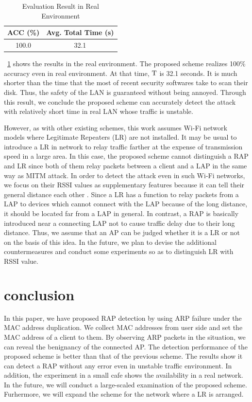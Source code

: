 \documentclass[conference]{IEEEtran}
\begin{document}
\begin{table}[t] 
    \begin{center}
        \caption{Evaluation Result in Real Environment}
        \label{tab:real}
        \begin{tabular}{c c} \hline
            ACC (\%) & Avg. Total Time (s) \\ \hline \hline
            100.0 & 32.1 \\ \hline
        \end{tabular}
    \end{center}
    \vspace{-2zh}
\end{table}

\tablename~\ref{tab:real} shows the results in the real environment.
The proposed scheme realizes 100\% accuracy even in real environment.
At that time, $\rm T$ is 32.1 seconds.
It is much shorter than the time that the most of recent security softwares take to scan their disk.
Thus, the safety of the LAN is guaranteed without being annoyed.
Through this result, we conclude the proposed scheme can accurately detect the attack with relatively short time in real LAN whose traffic is unstable.

However, as with other existing schemes, this work assumes Wi-Fi network models where Legitimate Repeaters (LR) are not installed.
It may be usual to introduce a LR in network to relay traffic farther at the expense of transmission speed in a large area.
In this case, the proposed scheme cannot distinguish a RAP and LR since both of them relay packets between a client and a LAP in the same way as MITM attack.
In order to detect the attack even in such Wi-Fi networks, we focus on their RSSI values as supplementary features because it can tell their general distance each other \cite{rssi}.
Since a LR has a function to relay packets from a LAP to devices which cannot connect with the LAP because of the long distance, it should be located far from a LAP in general.
In contrast, a RAP is basically introduced near a connecting LAP not to cause traffic delay due to their long distance.
Thus, we assume that an AP can be judged whether it is a LR or not on the basis of this idea.
In the future, we plan to devise the additional countermeasures and conduct some experiments so as to distinguish LR with RSSI value.

\section{conclusion}\label{sec:6}
In this paper, we have proposed RAP detection by using ARP failure under the MAC address duplication.
We collect MAC addresses from user side and set the MAC address of a client to them.
By observing ARP packets in the situation, we can reveal the benignancy of the connected AP.
The detection performance of the proposed scheme is better than that of the previous scheme.
The results show it can detect a RAP without any error even in unstable traffic environment.
In addition, the experiment in a small cafe shows the availability in a real network.
In the future, we will conduct a large-scaled examination of the proposed scheme.
Furhermore, we will expand the scheme for the network where a LR is arranged.
\end{document}
